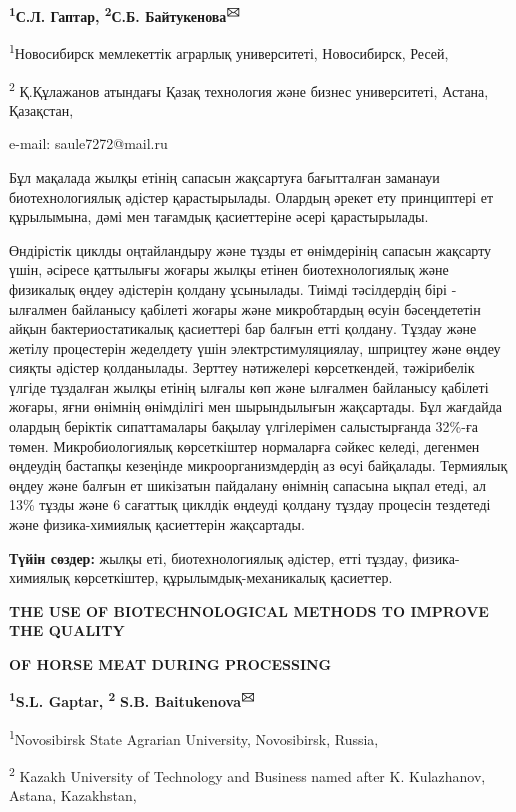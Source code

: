 {\bfseries \textsuperscript{1}С.Л. Гаптар, \textsuperscript{2}С.Б.
Байтукенова\textsuperscript{🖂}}

\textsuperscript{1}Новосибирск мемлекеттік аграрлық университеті,
Новосибирск, Ресей,

\textsuperscript{2} Қ.Құлажанов атындағы Қазақ технология және бизнес
университеті, Астана, Қазақстан,

e-mail: saule7272@mail.ru

Бұл мақалада жылқы етінің сапасын жақсартуға бағытталған заманауи
биотехнологиялық әдістер қарастырылады. Олардың әрекет ету принциптері
ет құрылымына, дәмі мен тағамдық қасиеттеріне әсері қарастырылады.

Өндірістік циклды оңтайландыру және тұзды ет өнімдерінің сапасын
жақсарту үшін, әсіресе қаттылығы жоғары жылқы етінен биотехнологиялық
және физикалық өңдеу әдістерін қолдану ұсынылады. Тиімді тәсілдердің
бірі - ылғалмен байланысу қабілеті жоғары және микробтардың өсуін
бәсеңдететін айқын бактериостатикалық қасиеттері бар балғын етті
қолдану. Тұздау және жетілу процестерін жеделдету үшін
электрстимуляциялау, шприцтеу және өңдеу сияқты әдістер қолданылады.
Зерттеу нәтижелері көрсеткендей, тәжірибелік үлгіде тұздалған жылқы
етінің ылғалы көп және ылғалмен байланысу қабілеті жоғары, яғни өнімнің
өнімділігі мен шырындылығын жақсартады. Бұл жағдайда олардың беріктік
сипаттамалары бақылау үлгілерімен салыстырғанда 32\%-ға төмен.
Микробиологиялық көрсеткіштер нормаларға сәйкес келеді, дегенмен
өңдеудің бастапқы кезеңінде микроорганизмдердің аз өсуі байқалады.
Термиялық өңдеу және балғын ет шикізатын пайдалану өнімнің сапасына
ықпал етеді, ал 13\% тұзды және 6 сағаттық циклдік өңдеуді қолдану
тұздау процесін тездетеді және физика-химиялық қасиеттерін жақсартады.

{\bfseries Түйін сөздер:} жылқы еті, биотехнологиялық әдістер, етті тұздау,
физика-химиялық көрсеткіштер, құрылымдық-механикалық қасиеттер.

{\bfseries THE USE OF BIOTECHNOLOGICAL METHODS TO IMPROVE THE QUALITY}

{\bfseries OF HORSE MEAT DURING PROCESSING}

{\bfseries \textsuperscript{1}S.L. Gaptar, \textsuperscript{2}}
{\bfseries S.B. Baitukenova\textsuperscript{🖂}}

\textsuperscript{1}Novosibirsk State Agrarian University, Novosibirsk,
Russia,

\textsuperscript{2} Kazakh University of Technology and Business named
after K. Kulazhanov, Astana, Kazakhstan,

